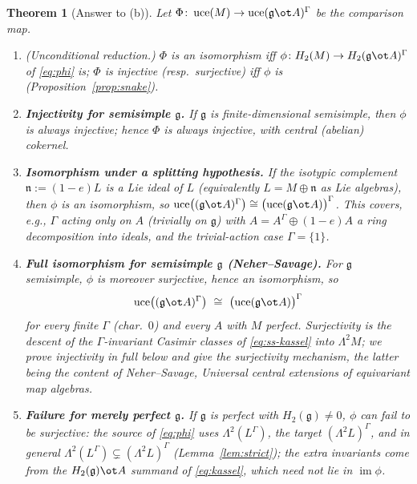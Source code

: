 \documentclass{amsart}
\newtheorem{theorem}{Theorem}
\theoremstyle{definition}
\DeclareMathOperator{\uce}{uce}
\DeclareMathOperator{\im}{im}
\newcommand{\g}{\mathfrak{g}}
\newcommand{\nn}{\mathfrak{n}}
\newcommand{\Gm}{\Gamma}
\newcommand{\ra}{\rightarrow}
\begin{document}
\begin{theorem}[Answer to (b)]\label{thm:partB}
Let $\Phi\colon\uce(M)\ra\uce(\g\ot A)^{\Gm}$ be the comparison map.
\begin{enumerate}
\item[(1)] \textup{(Unconditional reduction.)} $\Phi$ is an isomorphism iff
$\phi\colon H_2(M)\ra H_2(\g\ot A)^{\Gm}$ of \eqref{eq:phi} is; $\Phi$ is
injective (resp.\ surjective) iff $\phi$ is (Proposition~\ref{prop:snake}).
\item[(2)] \textbf{Injectivity for semisimple $\g$.}  If $\g$ is finite-dimensional
semisimple, then $\phi$ is \emph{always injective}; hence $\Phi$ is always
injective, with central (abelian) cokernel.
\item[(3)] \textbf{Isomorphism under a splitting hypothesis.}  If the isotypic
complement $\nn:=(1-e)L$ is a Lie ideal of $L$ (equivalently $L=M\oplus\nn$ as Lie
algebras), then $\phi$ is an isomorphism, so
$\uce\bigl((\g\ot A)^{\Gm}\bigr)\cong\bigl(\uce(\g\ot A)\bigr)^{\Gm}$.  This covers,
e.g., $\Gm$ acting only on $A$ (trivially on $\g$) with $A=A^{\Gm}\oplus(1-e)A$ a
ring decomposition into ideals, and the trivial-action case $\Gm=\{1\}$.
\item[(4)] \textbf{Full isomorphism for semisimple $\g$ (Neher--Savage).}  For
$\g$ semisimple, $\phi$ is moreover \emph{surjective}, hence an isomorphism, so
\[
   \uce\bigl((\g\ot A)^{\Gm}\bigr)\ \cong\ \bigl(\uce(\g\ot A)\bigr)^{\Gm}
\]
for every finite $\Gm$ (char.\ $0$) and every $A$ with $M$ perfect.  Surjectivity
is the descent of the $\Gm$-invariant Casimir classes of \eqref{eq:ss-kassel} into
$\Lambda^2 M$; we prove injectivity in full below and give the surjectivity
mechanism, the latter being the content of Neher--Savage,
\emph{Universal central extensions of equivariant map algebras}.
\item[(5)] \textbf{Failure for merely perfect $\g$.}  If $\g$ is perfect with
$H_2(\g)\ne0$, $\phi$ can fail to be surjective: the source of \eqref{eq:phi} uses
$\Lambda^2(L^{\Gm})$, the target $(\Lambda^2L)^{\Gm}$, and in general
$\Lambda^2(L^{\Gm})\subsetneq(\Lambda^2L)^{\Gm}$ (Lemma~\ref{lem:strict}); the
extra invariants come from the $H_2(\g)\ot A$ summand of \eqref{eq:kassel}, which
need not lie in $\im\phi$.
\end{enumerate}
\end{theorem}
\end{document}
